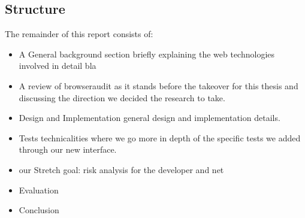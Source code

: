 \documentclass[a4paper,12pt]{report}
\begin{document}
\subsection{Structure}
The remainder of this report consists of:
\begin{itemize}
 \item A General background section briefly explaining the web technologies involved in detail bla
 \item A review of browseraudit as it stands before the takeover for this thesis and discussing the direction we decided the research to take.
 \item Design and Implementation general design and implementation details.
 \item Tests technicalities where we go more in depth of the specific tests we added through our new interface.
 \item our Stretch goal: risk analysis for the developer and net 
 \item Evaluation
 \item Conclusion
\end{itemize}











\end{document}
